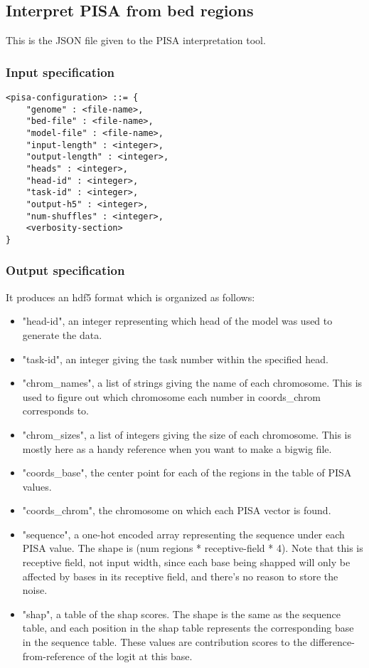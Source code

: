 \documentclass{article}
\begin{document}
\subsection{Interpret PISA from bed regions}

This is the JSON file given to the PISA interpretation tool. 

\subsubsection{Input specification}

\begin{lstlisting}
<pisa-configuration> ::= {
    "genome" : <file-name>,
    "bed-file" : <file-name>,
    "model-file" : <file-name>,
    "input-length" : <integer>,
    "output-length" : <integer>,
    "heads" : <integer>,
    "head-id" : <integer>,
    "task-id" : <integer>,
    "output-h5" : <integer>,
    "num-shuffles" : <integer>,
    <verbosity-section>
}
\end{lstlisting}

\subsubsection{Output specification}

It produces an hdf5 format which is organized as follows:

\begin{itemize}
    \item "head-id", an integer representing which head of the model was used to generate the data.
    \item "task-id", an integer giving the task number within the specified head. 
    \item "chrom\_names", a list of strings giving the name of each chromosome. This is used to figure out which chromosome each number in coords\_chrom corresponds to. 
    \item "chrom\_sizes", a list of integers giving the size of each chromosome. This is mostly here as a handy reference when you want to make a bigwig file. 
    \item "coords\_base", the center point for each of the regions in the table of PISA values. 
    \item "coords\_chrom", the chromosome on which each PISA vector is found. 
    \item "sequence", a one-hot encoded array representing the sequence under each PISA value. The shape is (num regions * receptive-field * 4). Note that this is receptive field, not input width, since each base being shapped will only be affected by bases in its receptive field, and there's no reason to store the noise. 
    \item "shap", a table of the shap scores. The shape is the same as the sequence table, and each position in the shap table represents the corresponding base in the sequence table. These values are contribution scores to the difference-from-reference of the logit at this base. 

\end{itemize}
\end{document}
